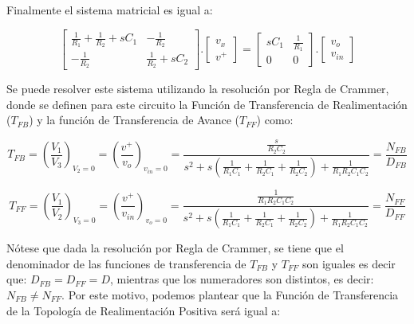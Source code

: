 \documentclass[12pt,a4paper]{article}
\begin{document}
Finalmente el sistema matricial es igual a:

\begin{equation}
    \label{eq_8}
    \begin{bmatrix}
        \frac{1}{R_1} + \frac{1}{R_2} + sC_1  & -\frac{1}{R_2} \\
        -\frac{1}{R_2} & \frac{1}{R_2} + sC_2    
    \end{bmatrix} . 
    \begin{bmatrix}
        v_x \\
        v^+
    \end{bmatrix} =
    \begin{bmatrix}
        sC_1 & \frac{1}{R_1} \\
        0 & 0
    \end{bmatrix} . 
    \begin{bmatrix}
        v_o \\
        v_{in}
    \end{bmatrix}
\end{equation}

Se puede resolver este sistema utilizando la resolución por Regla de Crammer, donde se definen para este circuito la Función de Transferencia de Realimentación ($T_{FB}$) y la función de Transferencia de Avance ($T_{FF}$) como:

\begin{equation}
    \label{eq_9}
    T_{FB} = \left(\frac{V_1}{V_3}\right)_{V_2 = 0} = \left(\frac{v^+}{v_{o}}\right)_{v_{in} = 0} = \frac{\frac{s}{R_{2}C_{2}}}{s^2 + s\left(\frac{1}{R_{1}C_{1}} + \frac{1}{R_{2}C_{1}} + \frac{1}{R_{2}C_{2}}\right) + \frac{1}{R_{1}R_{2}C_{1}C_{2}}}= \frac{N_{FB}}{D_{FB}}
\end{equation}

\begin{equation}
    \label{eq_10}
    T_{FF} = \left(\frac{V_1}{V_2}\right)_{V_3 = 0} = \left(\frac{v^+}{v_{in}}\right)_{v_{o} = 0} = \frac{\frac{1}{R_{1}R_{2}C_{1}C_{2}}}{s^2 + s\left(\frac{1}{R_{1}C_{1}} + \frac{1}{R_{2}C_{1}} + \frac{1}{R_{2}C_{2}}\right) + \frac{1}{R_{1}R_{2}C_{1}C_{2}}} = \frac{N_{FF}}{D_{FF}}
\end{equation}

Nótese que dada la resolución por Regla de Crammer, se tiene que el denominador de las funciones de transferencia de $T_{FB}$ y $T_{FF}$ son iguales es decir que: $D_{FB} = D_{FF} = D$, mientras que los  numeradores son distintos, es decir: $N_{FB} \ne N_{FF}$. Por este motivo, podemos plantear que la Función de Transferencia de la Topología de Realimentación Positiva será igual a:
\end{document}
